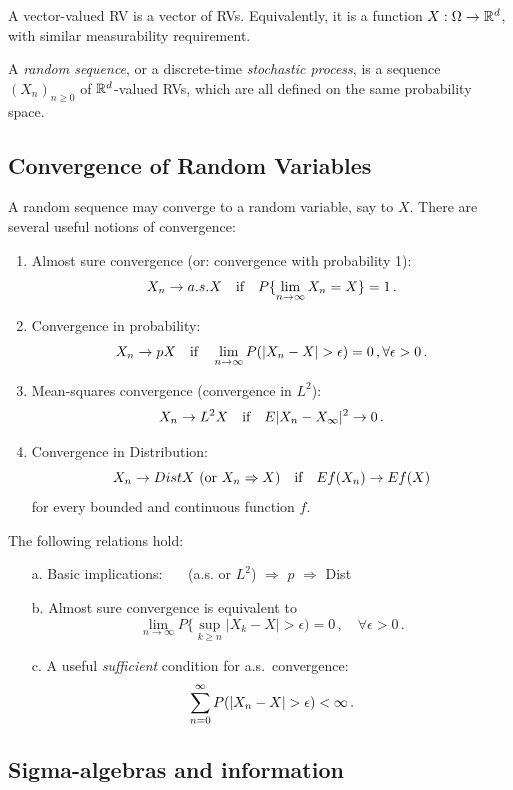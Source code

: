 A vector-valued RV is a vector of RVs. Equivalently, it is a
function $X:\Omega \to \mathbb{R}^d$, with similar measurability requirement.

A {\em random sequence}, or a discrete-time {\em stochastic process},
is a sequence $(X_n)_{n\ge 0}$ of
$\mathbb{R}^d$-valued RVs, which are all defined on the same probability space.

\subsection{Convergence of Random Variables}

A random sequence may converge to a random variable, say to $X$.
There are several useful notions of convergence:
\begin{enumerate}
\item
Almost sure convergence (or: convergence with probability 1):
$$
X_n \to{a.s.}X  \quad \text{if} \quad P \{\lim_{n\to\infty} X_n =X \} = 1 \,.
$$
\item
Convergence in probability:
$$
X_n \to{p} X \quad \text{if} \quad
\lim_{n\to\infty} P (|X_n - X| > \epsilon) =0\,,
\forall \epsilon >0\,.
$$
\item
Mean-squares convergence (convergence in $L^2$):
$$
 X_n \to{L^2} X
\quad \text{if} \quad
E |X_n - X_\infty|^2 \to 0 \,.$$
\item
Convergence in Distribution:
$$ \text{$X_n \to{Dist} X$ (or $X_n \Rightarrow X$)}
\quad \text{if} \quad
Ef(X_n) \to Ef(X)$$
for every bounded and continuous function $f$.
\end{enumerate}

\medskip

The following relations hold:
\begin{itemize}
\item[a.]
Basic implications: \ \ \
(a.s. or $L^2$) $\Longrightarrow$ $p$ $\Longrightarrow$ Dist
\item[b.]
Almost sure convergence is equivalent to
$$
\lim_{n\to\infty} P \{\sup_{k\geq n} |X_k - X| > \epsilon) = 0 \,,
\quad \forall \epsilon >0\,.
$$
\item[c.] A useful {\em sufficient} condition for a.s.\  convergence:
$$
\sum_{n=0}^{\infty} P(|X_n-X| > \epsilon) < \infty \,.
$$
\end{itemize}

\subsection{Sigma-algebras and information}

